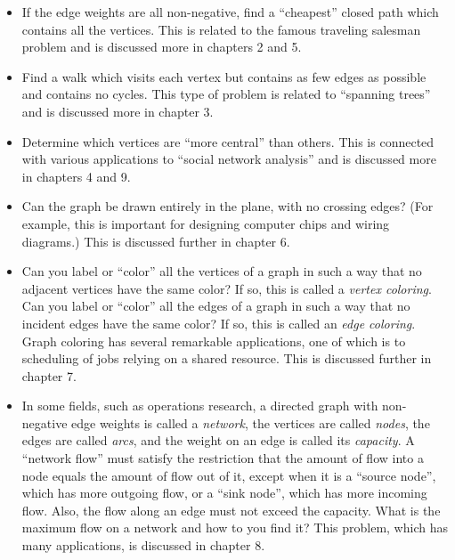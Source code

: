\begin{itemize}
\item
If the edge weights are all non-negative,
find a ``cheapest'' closed path which contains all the vertices.
This is related to the famous traveling salesman problem
and is discussed more in chapters 2 and 5.

\item
Find a walk which visits each vertex but contains as few edges as
possible and contains no cycles.
This type of problem is related to ``spanning trees'' and
is discussed more in chapter 3.

\item
Determine which vertices are ``more central'' than others.
This is connected with various applications to ``social network
analysis'' and is discussed more in chapters 4 and 9.

\item
Can the graph be drawn entirely in the plane, with no crossing edges?
(For example, this is important for designing computer chips and wiring diagrams.)
This is discussed further in chapter 6.

\item
Can you label or ``color'' all the vertices of a graph 
in such a way that no adjacent vertices have the same color?
If so, this is called a {\it vertex coloring}.
Can you label or ``color'' all the edges of a graph 
in such a way that no incident edges have the same color?
If so, this is called an {\it edge coloring}.
Graph coloring has several remarkable applications,
one of which is to scheduling of jobs relying on a shared resource.
This is discussed further in chapter 7.

\item
In some fields, such as operations research, a directed graph 
with non-negative edge weights is
called a 
{\it network}, the vertices are called {\it nodes}, the edges are
called {\it arcs}, and the weight on an edge is called
its {\it capacity}. A ``network flow'' must satisfy the restriction 
that the amount of flow into a node equals the amount of 
flow out of it, except when it is a ``source node'', which has 
more outgoing flow, or a ``sink node'', which has more incoming flow.
Also, the flow along an edge must not exceed the capacity.
What is the maximum flow on a network and how to you
find it? This problem, which has 
many applications, is discussed in chapter 8.
\end{itemize}

